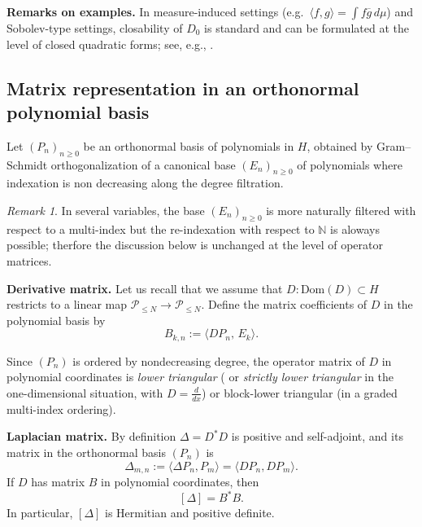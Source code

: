 \documentclass{amsart}
\numberwithin{equation}{section}
\theoremstyle{definition}
\theoremstyle{remark}
\newtheorem{remark}[theorem]{Remark}
\begin{document}
\medskip
\noindent\textbf{Remarks on examples.}
In measure-induced settings (e.g.\ $\langle f,g\rangle=\int f\overline g\,d\mu$) and Sobolev-type settings,
closability of $D_0$ is standard and can be formulated at the level of closed quadratic forms;
see, e.g., \cite{Fukushima,Ouhabaz,Kato,Mosco,KuwaeShioya}.


\subsection{Matrix representation in an orthonormal polynomial basis}

Let $(P_n)_{n\ge 0}$ be an orthonormal basis of polynomials in $H$, obtained by
Gram--Schmidt orthogonalization of a canonical base $(E_n)_{n \geq 0}$ of polynomials where indexation is non decreasing along the degree filtration. 

\begin{remark} In several variables, the base $(E_n)_{n \geq 0}$ is more naturally filtered with respect to a multi-index but the re-indexation with respect to $\mathbb{N}$ is aloways possible; therfore
the discussion below is unchanged at the level of operator matrices. \end{remark}

\medskip
\noindent\textbf{Derivative matrix.}
Let us recall that we assume that $D:\mathrm{Dom}(D)\subset H$ restricts to a linear map $\mathcal{P}_{\leq N} \rightarrow \mathcal{P}_{\leq N}.$
Define the matrix coefficients of $D$ in the polynomial basis by
\begin{equation}\label{eq:Dcoeff}
B_{k,n} := \big\langle D P_n,\, E_k\big \rangle.
\end{equation}

Since $(P_n)$ is ordered by nondecreasing degree, the operator matrix of $D$ in polynomial
coordinates is \emph{lower triangular} ( or \emph{strictly lower triangular} in the one-dimensional situation, with $D = \frac{d}{dx}$) or block-lower
triangular (in a graded multi-index ordering).

\medskip
\noindent\textbf{Laplacian matrix.}
By definition $\Delta=D^*D$ is positive and self-adjoint, and its matrix in the orthonormal basis
$(P_n)$ is
\begin{equation}\label{eq:DeltaMatrixEntries}
\Delta_{m,n} := \langle \Delta P_n, P_m\rangle
= \langle D P_n, D P_m\rangle.
\end{equation}
If $D$ has matrix $B$ in polynomial coordinates, then
\begin{equation}\label{eq:DeltaBB}
[\Delta] = B^*B.
\end{equation}
In particular, $[\Delta]$ is Hermitian and positive definite.
\end{document}
